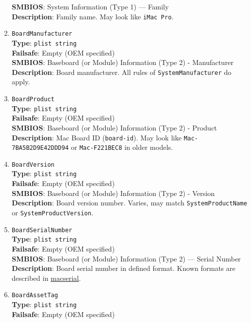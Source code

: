 \documentclass[]{article}
\begin{document}
\begin{enumerate}
  \textbf{SMBIOS}: System Information (Type 1) --- Family\\
  \textbf{Description}: Family name. May look like \texttt{iMac\ Pro}.
\item
  \texttt{BoardManufacturer}\\
  \textbf{Type}: \texttt{plist\ string}\\
  \textbf{Failsafe}: Empty (OEM specified)\\
  \textbf{SMBIOS}: Baseboard (or Module) Information (Type 2) -
  Manufacturer\\
  \textbf{Description}: Board manufacturer. All rules of
  \texttt{SystemManufacturer} do apply.
\item
  \texttt{BoardProduct}\\
  \textbf{Type}: \texttt{plist\ string}\\
  \textbf{Failsafe}: Empty (OEM specified)\\
  \textbf{SMBIOS}: Baseboard (or Module) Information (Type 2) -
  Product\\
  \textbf{Description}: Mac Board ID (\texttt{board-id}). May look like
  \texttt{Mac-7BA5B2D9E42DDD94} or \texttt{Mac-F221BEC8} in older
  models.
\item
  \texttt{BoardVersion}\\
  \textbf{Type}: \texttt{plist\ string}\\
  \textbf{Failsafe}: Empty (OEM specified)\\
  \textbf{SMBIOS}: Baseboard (or Module) Information (Type 2) -
  Version\\
  \textbf{Description}: Board version number. Varies, may match
  \texttt{SystemProductName} or \texttt{SystemProductVersion}.
\item
  \texttt{BoardSerialNumber}\\
  \textbf{Type}: \texttt{plist\ string}\\
  \textbf{Failsafe}: Empty (OEM specified)\\
  \textbf{SMBIOS}: Baseboard (or Module) Information (Type 2) --- Serial
  Number\\
  \textbf{Description}: Board serial number in defined format. Known
  formats are described in
  \href{https://github.com/acidanthera/macserial/blob/master/FORMAT.md}{macserial}.
\item
  \texttt{BoardAssetTag}\\
  \textbf{Type}: \texttt{plist\ string}\\
  \textbf{Failsafe}: Empty (OEM specified)\\

\end{enumerate}
\end{document}

